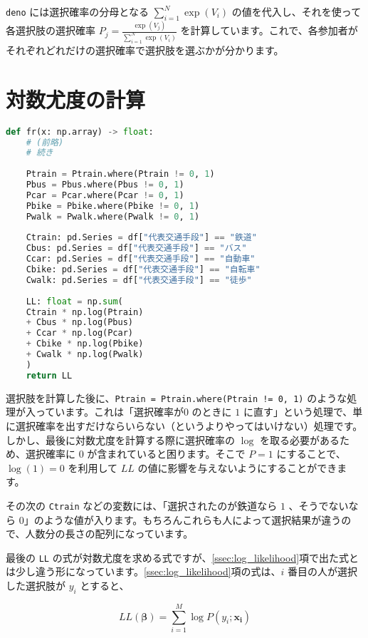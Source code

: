 \lstinline{deno} には選択確率の分母となる $\sum_{i=1}^N \exp(V_i)$ の値を代入し、それを使って各選択肢の選択確率 $P_j=\frac{\exp(V_j)}{\sum_{i=1}^N \exp(V_i)}$ を計算しています。これで、各参加者がそれぞれどれだけの選択確率で選択肢を選ぶかが分かります。
    
    \section{対数尤度の計算}
    
    \begin{lstlisting}[caption=対数尤度,language=Python]
def fr(x: np.array) -> float:
    # (前略)
    # 続き
    
    Ptrain = Ptrain.where(Ptrain != 0, 1)
    Pbus = Pbus.where(Pbus != 0, 1)
    Pcar = Pcar.where(Pcar != 0, 1)
    Pbike = Pbike.where(Pbike != 0, 1)
    Pwalk = Pwalk.where(Pwalk != 0, 1)
    
    Ctrain: pd.Series = df["代表交通手段"] == "鉄道"
    Cbus: pd.Series = df["代表交通手段"] == "バス"
    Ccar: pd.Series = df["代表交通手段"] == "自動車"
    Cbike: pd.Series = df["代表交通手段"] == "自転車"
    Cwalk: pd.Series = df["代表交通手段"] == "徒歩"
    
    LL: float = np.sum(
    Ctrain * np.log(Ptrain)
    + Cbus * np.log(Pbus)
    + Ccar * np.log(Pcar)
    + Cbike * np.log(Pbike)
    + Cwalk * np.log(Pwalk)
    )
    return LL
\end{lstlisting}
    
    
    選択肢を計算した後に、\lstinline{Ptrain = Ptrain.where(Ptrain != 0, 1)} のような処理が入っています。これは「選択確率が$0$ のときに $1$ に直す」という処理で、単に選択確率を出すだけならいらない（というよりやってはいけない）処理です。しかし、最後に対数尤度を計算する際に選択確率の $\log$ を取る必要があるため、選択確率に $0$ が含まれていると困ります。そこで $P=1$ にすることで、 $\log(1)=0$ を利用して $LL$ の値に影響を与えないようにすることができます。
    
    その次の \lstinline{Ctrain} などの変数には、「選択されたのが鉄道なら $1$ 、そうでないなら $0$」のような値が入ります。もちろんこれらも人によって選択結果が違うので、人数分の長さの配列になっています。
    
    最後の \lstinline{LL} の式が対数尤度を求める式ですが、\ref{ssec:log_likelihood}項で出た式とは少し違う形になっています。\ref{ssec:log_likelihood}項の式は、$i$ 番目の人が選択した選択肢が $y_i$ とすると、
    
    \begin{equation}
        LL(\boldsymbol\beta) = \sum_{i=1}^M \log P(y_i;\boldsymbol{x_i})
    \end{equation}
    
